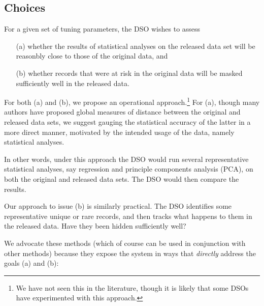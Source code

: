 \documentclass[11pt]{article}
\begin{document}
\subsection{Choices}

For a given set of tuning parameters, the DSO wishes to assess

\begin{itemize}

\item [(a)] whether the results of statistical  analyses on the released
data set will be reasonbly close to those of the original data, and 

\item [(b)]
whether records that were at risk in the original data will be masked 
sufficiently well in the released data.

\end{itemize}

For both (a) and (b), we propose an operational approach.\footnote{We
have not seen this in the literature, though it is likely that some DSOs
have experimented with this approach.}  For (a), though many authors have
proposed global measures of distance between the original and released
data sets, we suggest gauging the statistical accuracy of the latter in
a more direct manner, motivated by the intended usage of the data,
namely statistical analyses.

In other words, under this approach the DSO would run several
representative statistical analyses, say regression and principle
components analysis (PCA), on both the original and released data sets.
The DSO would then compare the results. 

Our approach to issue (b) is similarly practical.  The DSO identifies
some representative unique or rare records, and then tracks what happens
to them in the released data.  Have they been hidden sufficiently well?

We advocate these methods (which of course can be used in conjunction
with other methods) because they expose the system in ways that {\it
directly} address the goals (a) and (b):
\end{document}
